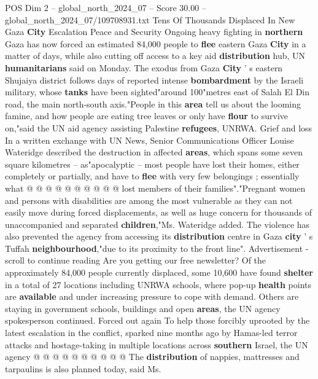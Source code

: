 \begin{textsample}{POS Dim 2 – global\_north\_2024\_07 – Score 30.00 – global\_north\_2024\_07/109708931.txt}  \label{ex:f2_pos_384}
Tens Of Thousands Displaced In New Gaza \textbf{City} Escalation Peace and Security Ongoing heavy fighting in \textbf{northern} Gaza has now forced an estimated 84,000 people to \textbf{flee} eastern Gaza \textbf{City} in a matter of days, while also cutting off access to a key aid \textbf{distribution} hub, UN \textbf{humanitarians} said on Monday.
The exodus from Gaza \textbf{City} ' s eastern Shujaiya district follows days of reported intense \textbf{bombardment} by the Israeli military, whose \textbf{tanks} have been sighted"around 100"metres east of Salah El Din road, the main north-south axis."People in this \textbf{area} tell us about the looming famine, and how people are eating tree leaves or only have \textbf{flour} to survive on,"said the UN aid agency assisting Palestine \textbf{refugees}, UNRWA.
Grief and loss In a written exchange with UN News, Senior Communications Officer Louise Wateridge described the destruction in affected \textbf{areas}, which spans some seven square kilometres -- as"apocalyptic -- most people have lost their homes, either completely or partially, and have to \textbf{flee} with very few belongings ; essentially what @ @ @ @ @ @ @ @ @ @ lost members of their families"."Pregnant women and persons with disabilities are among the most vulnerable as they can not easily move during forced displacements, as well as huge concern for thousands of unaccompanied and separated \textbf{children},"Ms.
Wateridge added.
The violence has also prevented the agency from accessing its \textbf{distribution} centre in Gaza \textbf{city} ' s Tuffah \textbf{neighbourhood},"due to its proximity to the front line".
Advertisement - scroll to continue reading Are you getting our free newsletter?
Of the approximately 84,000 people currently displaced, some 10,600 have found \textbf{shelter} in a total of 27 locations including UNRWA schools, where pop-up \textbf{health} points are \textbf{available} and under increasing pressure to cope with demand.
Others are staying in government schools, buildings and open \textbf{areas}, the UN agency spokesperson continued.
Forced out again To help those forcibly uprooted by the latest escalation in the conflict, sparked nine months ago by Hamas-led terror attacks and hostage-taking in multiple locations across \textbf{southern} Israel, the UN agency @ @ @ @ @ @ @ @ @ @ The \textbf{distribution} of nappies, mattresses and tarpaulins is also planned today, said Ms.

\end{textsample}
